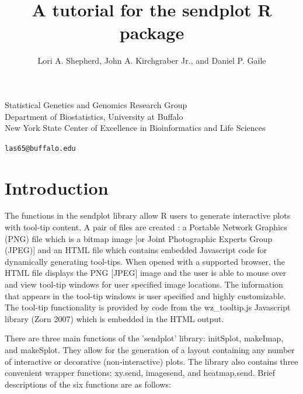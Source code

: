\documentclass[]{article}
\title{A tutorial for the sendplot R package}
\author{Lori A. Shepherd, John A. Kirchgraber Jr., and Daniel P. Gaile}
\begin{document}
\maketitle

\begin{center}
Statistical Genetics and Genomics Research Group\\
Department of Biostatistics, University at Buffalo\\
New York State Center of Excellence in Bioinformatics and Life Sciences
\end{center}

\begin{center}

{\tt las65@buffalo.edu}
\end{center}


\tableofcontents

\section{Introduction}


\indent The functions in the sendplot library allow R users to generate interactive plots with tool-tip content. A pair of files are created : a Portable Network Graphics (PNG) file which is a bitmap image [or  Joint Photographic Experts Group (JPEG)] and an HTML file which contains embedded Javascript code for dynamically generating tool-tips. When opened with a supported browser, the HTML file displays the PNG [JPEG] image and the user is able to mouse over and view tool-tip windows for user specified image locations. The information that appears in the tool-tip windows is user specified and highly customizable. The tool-tip functionality is provided by code from the  wz\_tooltip.js Javascript library (Zorn 2007) which is embedded in the HTML output.



\indent There are three main functions of the 'sendplot' library: initSplot, makeImap, and makeSplot. They allow for the generation of a layout containing any number of interactive or decorative (non-interactive) plots. The library also contains three convenient wrapper functions: xy.send, imagesend, and heatmap.send. Brief descriptions of the six functions are as follows:
\end{document}
